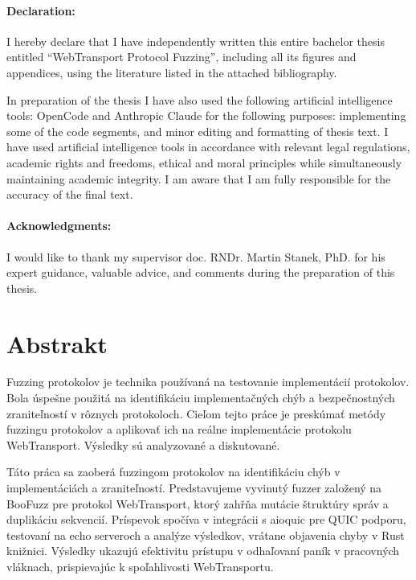\documentclass[12pt, twoside, openany]{book}
\def\mfnazov{WebTransport Protocol Fuzzing}
\begin{document}
\newpage
\pagestyle{plain}
\paragraph{Declaration:}
I hereby declare that I have independently written this entire
bachelor thesis entitled ``\mfnazov'', including all its
figures and appendices, using the literature listed in the attached
bibliography.

In preparation of the thesis I have also used the following artificial
intelligence tools: OpenCode and Anthropic Claude for the following
purposes: implementing some of the code segments, and minor editing and
formatting of thesis text. I
have used artificial intelligence tools in accordance with relevant
legal regulations, academic rights and freedoms, ethical and moral
principles while simultaneously maintaining academic integrity. I am
aware that I am fully responsible for the accuracy of the final text.

\paragraph{Acknowledgments:} I would like to thank my supervisor doc. RNDr. Martin Stanek, PhD. for his expert guidance, valuable advice, and comments during the preparation of this thesis.


\newpage 
\section*{Abstrakt}

Fuzzing protokolov je technika pou\v{z}\'{i}van\'{a} na testovanie implement\'{a}ci\'{i} protokolov. Bola \'{u}spe\v{s}ne pou\v{z}it\'{a} na identifik\'{a}ciu implementa\v{c}n\'{y}ch ch\'{y}b a bezpe\v{c}nostn\'{y}ch zranite\v{l}nost\'{i} v r\^{o}znych protokoloch. Cie\v{l}om tejto pr\'{a}ce je presk\'{u}ma\v{t} met\'{o}dy fuzzingu protokolov a aplikova\v{t} ich na re\'{a}lne implement\'{a}cie protokolu WebTransport. V\'{y}sledky s\'{u} analyzovan\'{e} a diskutovan\'{e}.

T\'{a}to pr\'{a}ca sa zaober\'{a} fuzzingom protokolov na identifik\'{a}ciu ch\'{y}b v implement\'{a}ci\'{a}ch a zranite\v{l}nost\'{i}. Predstavujeme vyvinut\'{y} fuzzer zalo\v{z}en\'{y} na BooFuzz pre protokol WebTransport, ktor\'{y} zah\v{r}\v{n}a mut\'{a}cie \v{s}trukt\'{u}ry spr\'{a}v a duplik\'{a}ciu sekvenci\'{i}. Pr\'{i}spevok spo\v{c}\'{i}va v integr\'{a}cii s aioquic pre QUIC podporu, testovan\'{i} na echo serveroch a anal\'{y}ze v\'{y}sledkov, vr\'{a}tane objavenia chyby v Rust kni\v{z}nici. V\'{y}sledky ukazuj\'{u} efektivitu pr\'{i}stupu v odha\v{l}ovan\'{i} pan\'{i}k v pracovn\'{y}ch vl\'{a}knach, prispieva\-j\'{u}c k spo\v{l}ahlivosti WebTransportu.
\end{document}
